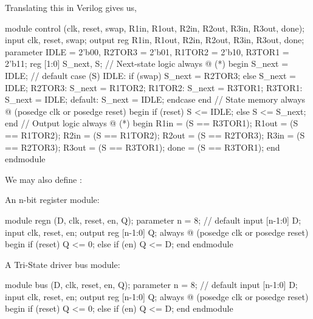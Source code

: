 \documentclass[12pt,openany]{book}
\begin{document}
\begin{minipage}[htp]{1\textwidth}
	Translating this in Verilog gives us,
	\begin{vhdl}
	module control (clk, reset, swap, R1in, R1out, R2in, R2out, R3in, R3out, done);
		input clk, reset, swap;
		output reg R1in, R1out, R2in, R2out, R3in, R3out, done;
		parameter IDLE = 2'b00, R2TOR3 = 2'b01, R1TOR2 = 2'b10, R3TOR1 = 2'b11;
		reg [1:0] S_next, S;
		// Next-state logic
		always @ (*) begin
			S_next = IDLE; // default
			case (S)
			IDLE: if (swap) S_next = R2TOR3;
				else S_next = IDLE;
				R2TOR3: S_next = R1TOR2;
				R1TOR2: S_next = R3TOR1;
				R3TOR1: S_next = IDLE;
				default: S_next = IDLE;
		endcase
		end
		// State memory
		always @ (posedge clk or posedge reset) begin
				if (reset) S <= IDLE;
				else S <= S_next;
			end
			// Output logic
			always @ (*) begin
				R1in = (S == R3TOR1);
				R1out = (S == R1TOR2);
				R2in = (S == R1TOR2);
				R2out = (S == R2TOR3);
				R3in = (S == R2TOR3);
				R3out = (S == R3TOR1);
				done = (S == R3TOR1);
		end
	endmodule
	\end{vhdl}
	
\end{minipage}
\newline

\begin{minipage}[htp]{1\textwidth}
	We may also define :\newline
	\begin{minipage}[htp]{0.45\textwidth}
		An n-bit register module:
		\begin{vhdl}
	module regn (D, clk, reset, en, Q);
		parameter n = 8; // default
		input [n-1:0] D;
		input clk, reset, en;
		output reg [n-1:0] Q;
		always @ (posedge clk or posedge reset) begin
		if (reset) Q <= 0;
		else if (en) Q <= D;
		end
	endmodule
		\end{vhdl}
	\end{minipage}
	\hfill
	\vline
	\hfill
	\begin{minipage}[htp]{0.45\textwidth}
		A Tri-State driver bus module:
		\begin{vhdl}
	module bus (D, clk, reset, en, Q);
		parameter n = 8; // default
		input [n-1:0] D;
		input clk, reset, en;
		output reg [n-1:0] Q;
		always @ (posedge clk or posedge reset) begin
			if (reset) Q <= 0;
			else if (en) Q <= D;
		end
	endmodule
		\end{vhdl}
	\end{minipage}
\end{minipage}
\newline
\vfill
\end{document}
